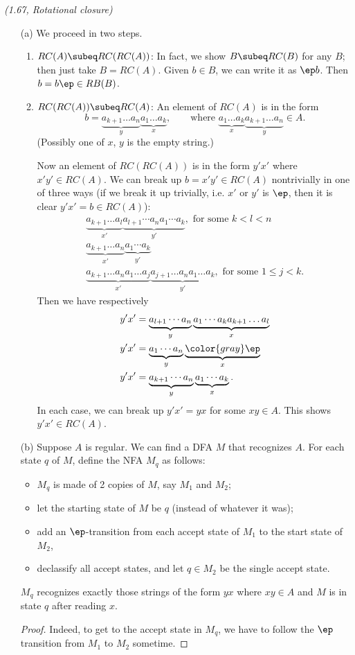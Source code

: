 \begin{problem}{\it(1.67, Rotational closure)}
\begin{enumerate}
\item[(a)] We proceed in two steps.
\begin{enumerate}
\item
$RC(A)\subeq RC(RC(A))$: In fact, we show $B\subeq RC(B)$ for any $B$; then just take $B=RC(A)$. Given $b\in B$, we can write it as $\ep b$. Then $b=b\ep\in RB(B)$.
\item
$RC(RC(A))\subeq RC(A)$: An element of $RC(A)$ is in the form
\[
b=\underbrace{a_{k+1}\ldots a_n}_y\underbrace{a_1\ldots a_k}_x,\qquad\text{where }\underbrace{a_1\ldots a_k}_x\underbrace{a_{k+1}\ldots a_n}_y\in A.
\]
(Possibly one of $x$, $y$ is the empty string.)

Now an element of $RC(RC(A))$ is in the form $y'x'$ where $x'y'\in RC(A)$. 
We can break up $b=x'y'\in RC(A)$ nontrivially in one of three ways (if we break it up trivially, i.e. $x'$ or $y'$ is $\ep$, then it is clear $y'x'=b\in RC(A)$):
\begin{gather*}
\underbrace{a_{k+1}\ldots a_l}_{x'}\underbrace{a_{l+1}\cdots a_na_1\cdots a_k}_{y'},\text{ for some }k<l<n\\
\underbrace{a_{k+1}\ldots a_n}_{x'}\underbrace{a_1\cdots a_k}_{y'}\\
\underbrace{a_{k+1}\ldots a_na_1\ldots a_j}_{x'}\underbrace{a_{j+1}\ldots a_na_1\ldots a_k}_{y'},\text{ for some }1\le j<k.
\end{gather*}
Then we have respectively
\begin{align*}
y'x'&=\underbrace{a_{l+1}\cdots a_n}_y\underbrace{a_1\cdots a_ka_{k+1}\ldots a_l}_x\\
y'x'&=\underbrace{a_1\cdots a_n}_y\underbrace{\color{gray}\ep}_x\\
y'x'&=\underbrace{a_{k+1}\cdots a_n}_y\underbrace{a_1\cdots a_k}_x.
\end{align*}
In each case, we can break up $y'x'=yx$ for some $xy\in A$. This shows $y'x'\in RC(A)$.
\end{enumerate}
\item[(b)] Suppose $A$ is regular. We can find a DFA $M$ that recognizes $A$. For each state $q$ of $M$, define the NFA $M_q$ as follows: 
\begin{itemize}
\item
$M_q$ is made of 2 copies of $M$, say $M_1$ and $M_2$;
\item
let the starting state of $M$ be $q$ (instead of whatever it was);
\item
add an $\ep$-transition from each accept state of $M_1$ to the start state of $M_2$,
\item
declassify all accept states, and let $q\in M_2$ be the single accept state.
\end{itemize}
\begin{clm}
$M_q$ recognizes exactly those strings of the form $yx$ where $xy\in A$ and $M$ is in state $q$ after reading $x$.
\end{clm}
\begin{proof} Indeed, to get to the accept state in $M_q$, we have to follow the $\ep$ transition from $M_1$ to $M_2$ sometime.


\end{proof}
\end{enumerate}
\end{problem}
